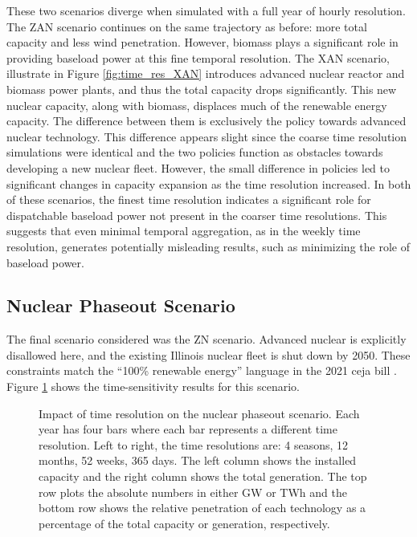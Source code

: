These two scenarios diverge when simulated with a full year of hourly
resolution. The \gls{ZAN} scenario continues on the same trajectory as before:
more total capacity and less wind penetration. However, biomass plays
a significant role in providing baseload power at this fine temporal resolution.
The \gls{XAN} scenario, illustrate in Figure \ref{fig:time_res_XAN} introduces
advanced nuclear reactor and biomass power plants, and
thus the total capacity drops significantly.  This new nuclear capacity, along
with biomass, displaces much of the
renewable energy capacity. The difference between them is exclusively the policy
towards advanced nuclear technology. This difference appears slight since the coarse
time resolution simulations were identical and the two policies function as obstacles
towards developing a new nuclear fleet. However, the small difference in policies
led to significant changes in capacity expansion as the time resolution increased.
In both of these scenarios, the finest time resolution indicates a significant
role for dispatchable baseload power not present in the coarser time resolutions.
This suggests that even minimal temporal aggregation, as in the weekly time resolution,
generates potentially misleading results, such as minimizing the role of baseload
power.

\subsection{Nuclear Phaseout Scenario}
The final scenario considered was the \gls{ZN} scenario. Advanced
nuclear is explicitly disallowed here, and the existing Illinois nuclear fleet is shut down by
2050. These constraints match the ``100\% renewable energy'' language in the 2021
\gls{ceja} bill \cite{harmon_climate_2021}. Figure \ref{fig:time_res_ZN} shows
the time-sensitivity results for this scenario.

\begin{figure}[H]
  \centering
  \resizebox{0.95\columnwidth}{!}{}
  \caption{Impact of time resolution on the nuclear phaseout scenario.  Each
  year has four bars where each bar represents a different time resolution.
  Left to right, the time resolutions are: 4 seasons, 12 months, 52 weeks, 365 days.
  The left column shows the installed capacity and the right column shows the
  total generation. The top row plots the absolute numbers in either GW or TWh
  and the bottom row shows the relative penetration of each technology as a
  percentage of the total capacity or generation, respectively.}
  \label{fig:time_res_ZN}
\end{figure}

